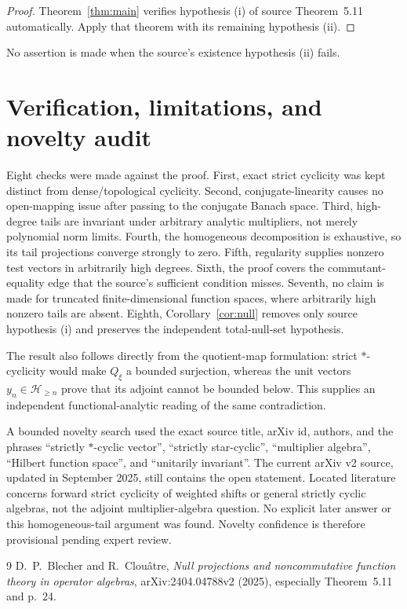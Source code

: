 \documentclass[11pt]{article}
\newcommand{\Hh}{\mathcal H}
\begin{document}
\begin{proof}
Theorem~\ref{thm:main} verifies hypothesis (i) of source
Theorem~5.11 automatically.  Apply that theorem with its remaining
hypothesis (ii).
\end{proof}

No assertion is made when the source's existence hypothesis (ii) fails.

\section{Verification, limitations, and novelty audit}

Eight checks were made against the proof.  First, exact strict cyclicity was
kept distinct from dense/topological cyclicity.  Second, conjugate-linearity
causes no open-mapping issue after passing to the conjugate Banach space.
Third, high-degree tails are invariant under arbitrary analytic multipliers,
not merely polynomial norm limits.  Fourth, the homogeneous decomposition
is exhaustive, so its tail projections converge strongly to zero.  Fifth,
regularity supplies nonzero test vectors in arbitrarily high degrees.  Sixth,
the proof covers the commutant-equality edge that the source's sufficient
condition misses.  Seventh, no claim is made for truncated finite-dimensional
function spaces, where arbitrarily high nonzero tails are absent.  Eighth,
Corollary~\ref{cor:null} removes only source hypothesis (i) and preserves the
independent total-null-set hypothesis.

The result also follows directly from the quotient-map formulation: strict
$*$-cyclicity would make $Q_\xi$ a bounded surjection, whereas the unit
vectors $y_n\in\Hh_{\geq n}$ prove that its adjoint cannot be bounded below.
This supplies an independent functional-analytic reading of the same
contradiction.

A bounded novelty search used the exact source title, arXiv id, authors, and
the phrases ``strictly $*$-cyclic vector'', ``strictly star-cyclic'',
``multiplier algebra'', ``Hilbert function space'', and ``unitarily
invariant''.  The current arXiv v2 source, updated in September 2025, still
contains the open statement.  Located literature concerns forward strict
cyclicity of weighted shifts or general strictly cyclic algebras, not the
adjoint multiplier-algebra question.  No explicit later answer or this
homogeneous-tail argument was found.  Novelty confidence is therefore
provisional pending expert review.

\begin{thebibliography}{9}
D.~P.~Blecher and R.~Clou\^atre,
\emph{Null projections and noncommutative function theory in operator
algebras}, arXiv:2404.04788v2 (2025), especially Theorem~5.11 and p.~24.
\end{thebibliography}
\end{document}
